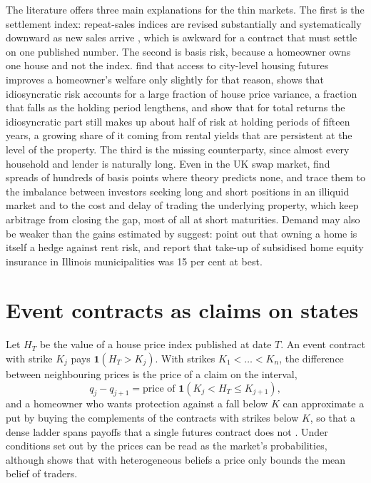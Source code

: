 \documentclass[12pt,a4paper]{article}
\begin{document}
The literature offers three main explanations for the thin markets. The first is the settlement index: repeat-sales indices are revised substantially and systematically downward as new sales arrive \citep{clapham2006revisiting}, which is awkward for a contract that must settle on one published number. The second is basis risk, because a homeowner owns one house and not the index. \citet{dejong2008hedging} find that access to city-level housing futures improves a homeowner's welfare only slightly for that reason, \citet{giacoletti2021idiosyncratic} shows that idiosyncratic risk accounts for a large fraction of house price variance, a fraction that falls as the holding period lengthens, and \citet{eichholtz2021total} show that for total returns the idiosyncratic part still makes up about half of risk at holding periods of fifteen years, a growing share of it coming from rental yields that are persistent at the level of the property. The third is the missing counterparty, since almost every household and lender is naturally long. Even in the UK swap market, \citet{lizieri2012pricing} find spreads of hundreds of basis points where theory predicts none, and trace them to the imbalance between investors seeking long and short positions in an illiquid market and to the cost and delay of trading the underlying property, which keep arbitrage from closing the gap, most of all at short maturities. Demand may also be weaker than the gains estimated by \citet{englund2002hedging} suggest: \citet{sinai2005owner} point out that owning a home is itself a hedge against rent risk, and \citet{caplin2003home} report that take-up of subsidised home equity insurance in Illinois municipalities was 15 per cent at best.

\section{Event contracts as claims on states}

Let $H_T$ be the value of a house price index published at date $T$. An event contract with strike $K_j$ pays $\mathbf{1}(H_T > K_j)$. With strikes $K_1 < \dots < K_n$, the difference between neighbouring prices is the price of a claim on the interval,
\begin{equation}
  q_j - q_{j+1} = \text{price of } \mathbf{1}(K_j < H_T \le K_{j+1}),
\end{equation}
and a homeowner who wants protection against a fall below $K$ can approximate a put by buying the complements of the contracts with strikes below $K$, so that a dense ladder spans payoffs that a single futures contract does not \citep{ross1976options,breeden1978prices}. Under conditions set out by \citet{wolfers2006interpreting} the prices can be read as the market's probabilities, although \citet{manski2006interpreting} shows that with heterogeneous beliefs a price only bounds the mean belief of traders.
\end{document}
